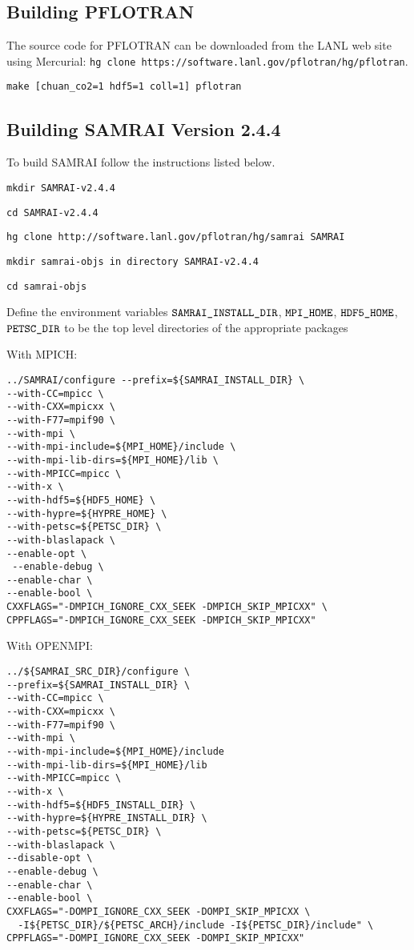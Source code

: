 \documentclass[12pt]{article}
\begin{document}
\subsection{Building PFLOTRAN}

The source code for PFLOTRAN can be downloaded from the LANL web site using Mercurial: \verb|hg clone https://software.lanl.gov/pflotran/hg/pflotran|.

\verb|make [chuan_co2=1 hdf5=1 coll=1] pflotran|

\subsection{Building SAMRAI Version 2.4.4}

\noindent
To build SAMRAI follow the instructions listed below.

{\tt mkdir SAMRAI-v2.4.4}

{\tt cd SAMRAI-v2.4.4}

{\tt hg clone http://software.lanl.gov/pflotran/hg/samrai SAMRAI}

{\tt mkdir samrai-objs in directory SAMRAI-v2.4.4}

{\tt cd samrai-objs}

Define the environment variables $\verb|SAMRAI_INSTALL_DIR|$, $\verb|MPI_HOME|$, $\verb|HDF5_HOME|$, \linebreak $\verb|PETSC_DIR|$ to be the top level directories of the appropriate packages

\noindent
With MPICH:
\begin{verbatim}
../SAMRAI/configure --prefix=${SAMRAI_INSTALL_DIR} \
--with-CC=mpicc \
--with-CXX=mpicxx \
--with-F77=mpif90 \
--with-mpi \
--with-mpi-include=${MPI_HOME}/include \
--with-mpi-lib-dirs=${MPI_HOME}/lib \
--with-MPICC=mpicc \
--with-x \
--with-hdf5=${HDF5_HOME} \
--with-hypre=${HYPRE_HOME} \
--with-petsc=${PETSC_DIR} \
--with-blaslapack \
--enable-opt \
 --enable-debug \
--enable-char \
--enable-bool \
CXXFLAGS="-DMPICH_IGNORE_CXX_SEEK -DMPICH_SKIP_MPICXX" \
CPPFLAGS="-DMPICH_IGNORE_CXX_SEEK -DMPICH_SKIP_MPICXX"
\end{verbatim}

\noindent
With OPENMPI:
\begin{verbatim}
../${SAMRAI_SRC_DIR}/configure \
--prefix=${SAMRAI_INSTALL_DIR} \
--with-CC=mpicc \
--with-CXX=mpicxx \
--with-F77=mpif90 \
--with-mpi \
--with-mpi-include=${MPI_HOME}/include 
--with-mpi-lib-dirs=${MPI_HOME}/lib 
--with-MPICC=mpicc \
--with-x \
--with-hdf5=${HDF5_INSTALL_DIR} \
--with-hypre=${HYPRE_INSTALL_DIR} \
--with-petsc=${PETSC_DIR} \
--with-blaslapack \
--disable-opt \
--enable-debug \
--enable-char \
--enable-bool \
CXXFLAGS="-DOMPI_IGNORE_CXX_SEEK -DOMPI_SKIP_MPICXX \
  -I${PETSC_DIR}/${PETSC_ARCH}/include -I${PETSC_DIR}/include" \
CPPFLAGS="-DOMPI_IGNORE_CXX_SEEK -DOMPI_SKIP_MPICXX"
\end{verbatim}
\end{document}
